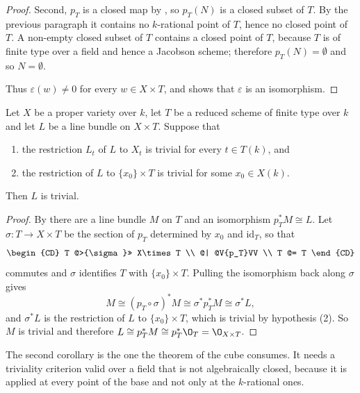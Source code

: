 \begin{proof}
Second, $p_T$ is a closed map by , so
$p_T(N)$ is a closed subset of $T$.  By the previous paragraph it contains no
$k$-rational point of $T$, hence no closed point of $T$.  A non-empty closed
subset of $T$ contains a closed point of $T$, because $T$ is of finite type
over a field and hence a Jacobson scheme; therefore $p_T(N)=\emptyset$ and
so $N=\emptyset$.

Thus $\varepsilon(w)\neq0$ for every $w\in X\times T$, and
 shows that $\varepsilon$ is an
isomorphism.
\end{proof}

\begin{corollary}\label{cor:cube-seesaw-trivial}
Let $X$ be a proper variety over $k$, let $T$ be a reduced scheme of finite
type over $k$ and let $L$ be a line bundle on $X\times T$.  Suppose that
\begin{enumerate}
  \item the restriction $L_t$ of $L$ to $X_t$ is trivial for every
  $t\in T(k)$, and
  \item the restriction of $L$ to $\{x_0\}\times T$ is trivial for some
  $x_0\in X(k)$.
\end{enumerate}
Then $L$ is trivial.
\end{corollary}
\begin{proof}
By  there are a line bundle $M$ on $T$ and an
isomorphism $p_T^*M\cong L$.  Let $\sigma\colon T\to X\times T$ be the section
of $p_T$ determined by $x_0$ and $\mathrm{id}_T$, so that
\[
  \begin{CD}
    T @>{\sigma}>> X\times T \\
    @| @V{p_T}VV \\
    T @= T
  \end{CD}
\]
commutes and $\sigma$ identifies $T$ with $\{x_0\}\times T$.  Pulling the
isomorphism back along $\sigma$ gives
\[
  M\cong(p_T\circ\sigma)^*M\cong\sigma^*p_T^*M\cong\sigma^*L ,
\]
and $\sigma^*L$ is the restriction of $L$ to $\{x_0\}\times T$, which is
trivial by hypothesis (2).  So $M$ is trivial and therefore
$L\cong p_T^*M\cong p_T^*\O_T=\O_{X\times T}$.
\end{proof}

The second corollary is the one the theorem of the cube consumes.  It needs a
triviality criterion valid over a field that is not algebraically closed,
because it is applied at every point of the base and not only at the
$k$-rational ones.

